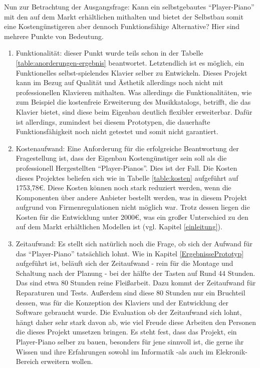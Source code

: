 Nun zur Betrachtung der Ausgangsfrage: Kann ein selbstgebautes \enquote{Player-Piano} mit den
auf dem Markt erhältlichen mithalten und bietet der Selbstbau somit eine Kostengünstigeren aber dennoch Funktionsfähige
Alternative? \newline
Hier sind mehrere Punkte von Bedeutung.
\begin{enumerate}
    \item Funktionalität: dieser Punkt wurde teils schon in der Tabelle \ref{table:anorderungen-ergebnis} beantwortet.
    Letztendlich ist es möglich, ein Funktionelles selbst-spielendes Klavier selber zu Entwickeln. Dieses Projekt  kann im Bezug
    auf Qualität und Ästhetik allerdings noch nicht mit professionellen Klavieren mithalten.
    Was allerdings die Funktionalitäten, wie zum Beispiel die kostenfreie Erweiterung des Musikkatalogs, betrifft, die das Klavier bietet,
    sind diese beim Eigenbau deutlich flexibler erweiterbar.
    Dafür ist allerdings, zumindest bei diesem Prototypen, die dauerhafte Funktionsfähigkeit noch nicht getestet und somit nicht
    garantiert.
    \item Kostenaufwand: Eine Anforderung für die erfolgreiche Beantwortung der Fragestellung ist, dass der Eigenbau Kostengünstiger
    sein soll als die professionell Hergestellten \enquote{Player-Pianos}. Dies ist der Fall. Die Kosten dieses Projektes
    beliefen sich wie in Tabelle \ref{table:kosten} aufgeführt auf 1753,78\euro{}. Diese Kosten können noch stark reduziert
    werden, wenn die Komponenten über andere Anbieter bestellt werden, was in diesem Projekt aufgrund von Firmenregulationen
    nicht möglich war. Trotz dessen liegen die Kosten für die Entwicklung unter 2000\euro{}, was ein großer Unterschied
    zu den auf dem Markt erhältlichen Modellen ist (vgl. Kapitel \ref{einleitung}).
    \item Zeitaufwand: Es stellt sich natürlich noch die Frage, ob sich der Aufwand für das \enquote{Player-Piano} tatsächlich
    lohnt. Wie in Kapitel \ref{ErgebnissePrototyp} aufgeführt ist, beläuft sich der Zeitaufwand - rein für die Montage und Schaltung
    nach der Planung - bei der hälfte der Tasten auf Rund 44 Stunden. Das sind etwa 80 Stunden reine Fleißarbeit.
    Dazu kommt der Zeitaufwand für Reparaturen und Tests. Außerdem sind diese 80 Stunden nur ein Bruchteil dessen, was
    für die Konzeption des Klaviers und der Entwicklung der Software gebraucht wurde. Die Evaluation ob der Zeitaufwand
    sich lohnt, hängt daher sehr stark davon ab, wie viel Freude diese Arbeiten den Personen die dieses Projekt
    umsetzen bringen. Es steht fest, dass das Projekt, ein Player-Piano selber zu bauen, besonders für jene sinnvoll ist,
    die gerne ihr Wissen und ihre Erfahrungen sowohl im Informatik -als auch im Elekronik-Bereich erweitern wollen.
\end{enumerate}

